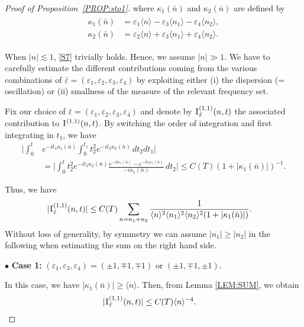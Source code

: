 \documentclass[%
11pt,  reqno]{amsart}
\newcommand{\1}{\hspace{0.2mm}\text{I}\hspace{0.2mm}}
\newcommand{\noi}{\noindent}
\newcommand{\eps}{\varepsilon}
\newcommand{\kk}{\kappa}
\newcommand{\les}{\lesssim}
\newcommand{\jb}[1]
{\langle #1 \rangle}
\numberwithin{equation}{section}
\numberwithin{theorem}{section}
\begin{document}
\begin{proof}[Proof of Proposition~\ref{PROP:sto1}]
\noi
where $\kk_1( \bar n)$ and $\kk_2( \bar n)$ are defined by 
\begin{align*}
\begin{split}
\kk_1(\bar n) & = %
 \eps_1 \jb{n} -\eps_3 \jb{n_1} - \eps_4\jb{n_2}, \\ %
\kk_2(\bar n) & = %
 \eps_2 \jb{n} +\eps_3 \jb{n_1} + \eps_4\jb{n_2}.
\end{split}
\end{align*}

\noi
When $|n| \les 1$, \eqref{S7} trivially holds.
Hence, we assume $|n|\gg 1$. 
We have to carefully  estimate the different 
contributions coming from the various combinations of  $\bar \eps = (\eps_1, \eps_2, \eps_3, \eps_4)$
by  exploiting either (i) the dispersion (= oscillation) 
or (ii) smallness of the measure of the relevant frequency set.

Fix our choice of $\bar \eps = (\eps_1, \eps_2, \eps_3, \eps_4)$ 
and denote by $\1^{(1,1)}_{\bar \eps}(n,t)$ the associated contribution to $\1^{(1,1)}(n,t)$.
By switching the order of integration and first integrating in $t_1$, we have 
\begin{align*}
\bigg|\int_0^{t} 
& e^{-i t_1 \kk_1( \bar n)}
 \int_0^{t_1} 
t_2^2   e^{-i t_2\kk_2(\bar n)}
 \, dt_2dt_1\bigg| \\
& = \bigg| \int_0^{t} 
t_2^2   e^{-i t_2\kk_2(\bar n)}
\frac{e^{-i t \kk_1( \bar n)} - e^{-i t_2 \kk_1( \bar n)}}{-i \kk_1(\bar n)}
 \, dt_2\bigg| \le C(T) (1+ |\kk_1(\bar n)|)^{-1}.
\end{align*}


\noi
Thus,  we have 
\begin{align}
|\1^{(1,1)}_{\bar \eps} (n, t)|
& \le C(T)   
\sum_{n = n_1 + n_2} 
\frac{1}{\jb{n}^2\jb{n_1}^2 \jb{n_2}^2(1+ |\kk_1(\bar n)|)}.
\label{SS1}
\end{align}
Without loss of generality, by symmetry we can assume $|n_1|\geq |n_2|$ in the following when estimating
the sum on the right hand side.

\smallskip

\noi
$\bullet$ {\bf Case 1:}
$(\eps_1, \eps_3, \eps_4) = (\pm 1, \mp1, \mp1)$ or
$(\pm1, \mp1, \pm1)$.

In this case, we have 
$|\kk_1(\bar n)| \geq \jb{n}$.
Then, from Lemma \ref{LEM:SUM}, we obtain
\begin{align*}
|\1^{(1,1)}_{\bar \eps} (n, t)|
& \le C(T)   \jb{n}^{-4}.
\end{align*}


\end{proof}
\end{document}
